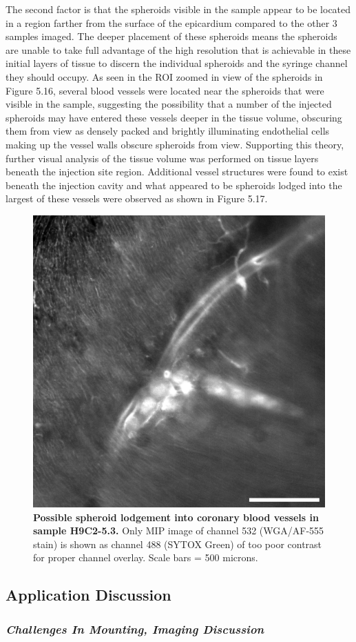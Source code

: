 The second factor is that the spheroids visible in the sample appear to be located in a region farther from the surface of the epicardium compared to the other 3 samples imaged. The deeper placement of these spheroids means the spheroids are unable to take full advantage of the high resolution that is achievable in these initial layers of tissue to discern the individual spheroids and the syringe channel they should occupy. As seen in the ROI zoomed in view of the spheroids in Figure 5.16, several blood vessels were located near the spheroids that were visible in the sample, suggesting the possibility that a number of the injected spheroids may have entered these vessels deeper in the tissue volume, obscuring them from view as densely packed and brightly illuminating endothelial cells making up the vessel walls obscure spheroids from view. Supporting this theory, further visual analysis of the tissue volume was performed on tissue layers beneath the injection site region. Additional vessel structures were found to exist beneath the injection cavity and what appeared to be spheroids lodged into the largest of these vessels were observed as shown in Figure 5.17.

\begin{figure}[H]
\centering
\includegraphics[width=0.5\linewidth]{Images/Spheroids_In_Vessel.png}
\caption{\textbf{Possible spheroid lodgement into coronary blood vessels in sample H9C2-5.3.} Only MIP image of channel 532 (WGA/AF-555 stain) is shown as channel 488 (SYTOX Green) of too poor contrast for proper channel overlay. Scale bars = 500 microns.}
\label{fig:enter-label}
\end{figure}
\medskip

\subsection{Application Discussion}
\subsubsection{\textit{Challenges In Mounting, Imaging Discussion}}

